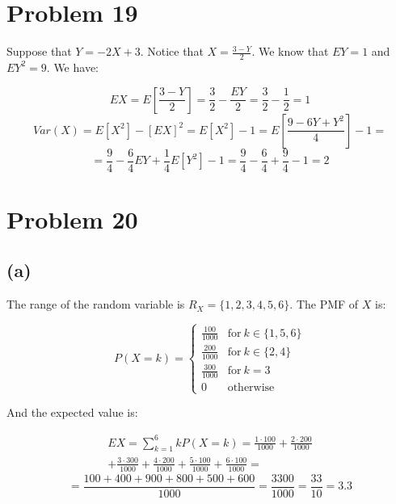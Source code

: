 \documentclass{article}
\begin{document}
\section*{Problem 19}


Suppose that \(Y = -2X + 3\). Notice that \(X = \frac{3 - Y}{2}\). We know that \(EY = 1\) and \(EY^{2} = 9\). We have:

\begin{equation*}
    EX = E[\frac{3 - Y}{2}] = \frac{3}{2} - \frac{EY}{2} = \frac{3}{2} - \frac{1}{2} = 1
\end{equation*}
\begin{equation*}
    Var(X) = E[X^{2}] - [EX]^{2} = E[X^{2}] - 1 = E[\frac{9 - 6Y + Y^{2}}{4}] - 1 = 
\end{equation*}
\begin{equation*}
    = \frac{9}{4} - \frac{6}{4}EY + \frac{1}{4}E[Y^{2}] - 1 = \frac{9}{4} - \frac{6}{4} + \frac{9}{4} - 1 = 2
\end{equation*}

\section*{Problem 20}

\subsection*{(a)}

The range of the random variable is \(R_{X} = \{1, 2, 3, 4, 5, 6\}\). The PMF of \(X\) is:

\begin{equation*}
    P(X = k) =
    \begin{cases}
        \frac{100}{1000} & \mbox{for} \ k \in \{1, 5, 6\} \\
        \frac{200}{1000} & \mbox{for} \ k \in \{2, 4\} \\
        \frac{300}{1000} & \mbox{for} \ k = 3 \\
        0 & \mbox{otherwise} 
    \end{cases}
\end{equation*}

And the expected value is:

\begin{multline*}
    EX = \sum_{k=1}^{6} kP(X=k) = \frac{1 \cdot 100}{1000} + \frac{2 \cdot 200}{1000}  \\ 
    + \frac{3 \cdot 300}{1000} + \frac{4 \cdot 200}{1000} + \frac{5 \cdot 100}{1000} + \frac{6 \cdot 100}{1000} =
\end{multline*}
\begin{equation*}
    = \frac{100 + 400 + 900 + 800 + 500 + 600}{1000} = \frac{3300}{1000} = \frac{33}{10} = 3.3
\end{equation*}
\end{document}
